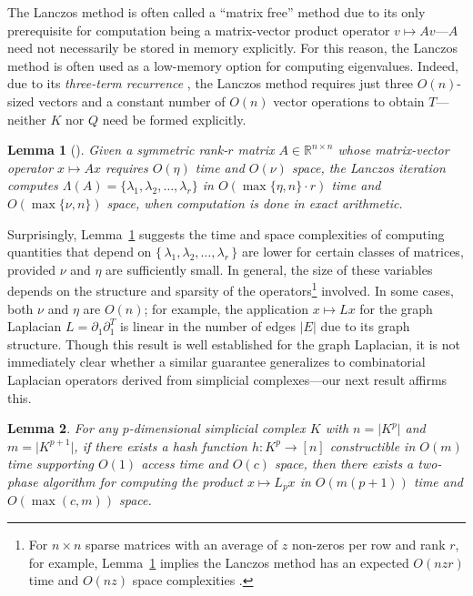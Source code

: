\documentclass[pdflatex,sn-mathphys-num]{sn-jnl}
\newtheorem{lemma}{Lemma}
\begin{document}
The Lanczos method is often called a ``matrix free'' method due to its only prerequisite for computation being a matrix-vector product operator \(v \mapsto Av\)---\(A\) need not necessarily be stored in memory explicitly. For this reason, the Lanczos method is often used as a low-memory option for computing eigenvalues. Indeed, due to its \emph{three-term recurrence} \cite{simon1984analysis}, the Lanczos method requires just three \(O(n)\)-sized vectors and a constant number of \(O(n)\) vector operations to obtain \(T\)---neither \(K\) nor \(Q\) need be formed explicitly.
\begin{lemma}[\cite{parlett1994we}]\label{lemma:exact_arith_lanczos}
	Given a symmetric rank-$r$ matrix $A \in \mathbb{R}^{n \times n}$ whose matrix-vector operator $x \mapsto A x$ requires $O(\eta)$ time and $O(\nu)$ space, the Lanczos iteration computes $\Lambda(A) = \{ \lambda_1, \lambda_2, \dots, \lambda_r \}$ in $O\left( \max \{ \eta, n \} \cdot r \right )$ time and $O(\max \{ \nu, n \})$ space, when computation is done in exact arithmetic.
\end{lemma}
\noindent
Surprisingly, Lemma~\ref{lemma:exact_arith_lanczos} suggests the time and space complexities of computing quantities that depend on \(\{\,\lambda_{1},\lambda_{2},\ldots,\lambda_{r}\,\}\) are lower for certain classes of matrices, provided \(\nu\) and \(\eta\) are sufficiently small. In general, the size of these variables depends on the structure and sparsity of the operators\footnote{For \(n \times n\) sparse matrices with an average of \(z\) non-zeros per row and rank \(r\), for example, Lemma~\ref{lemma:exact_arith_lanczos} implies the Lanczos method has an expected \(O(nzr)\) time and \(O(nz)\) space complexities \cite{golub2013matrix}.} involved. In some cases, both \(\nu\) and \(\eta\) are \(O(n)\); for example, the application \(x \mapsto Lx\) for the graph Laplacian \(L = \partial_{1}\partial_{1}^{T}\) is linear in the number of edges \(|E|\) due to its graph structure. Though this result is well established for the graph Laplacian, it is not immediately clear whether a similar guarantee generalizes to combinatorial Laplacian operators derived from simplicial complexes---our next result affirms this.

\begin{lemma}\label{lemma:matvec_lap}
For any $p$-dimensional simplicial complex $K$ with $n = \lvert K^p \rvert$ and $m = \lvert K^{p + 1} \rvert$, if there exists a hash function $h: K^p \to [n]$ constructible in $O(m)$ time supporting $O(1)$ access time and $O(c)$ space, then there exists a two-phase algorithm for computing the product $x \mapsto L_p x$ in $O(m(p + 1))$ time and $O(\max(c , m))$ space.
\end{lemma}
\end{document}
